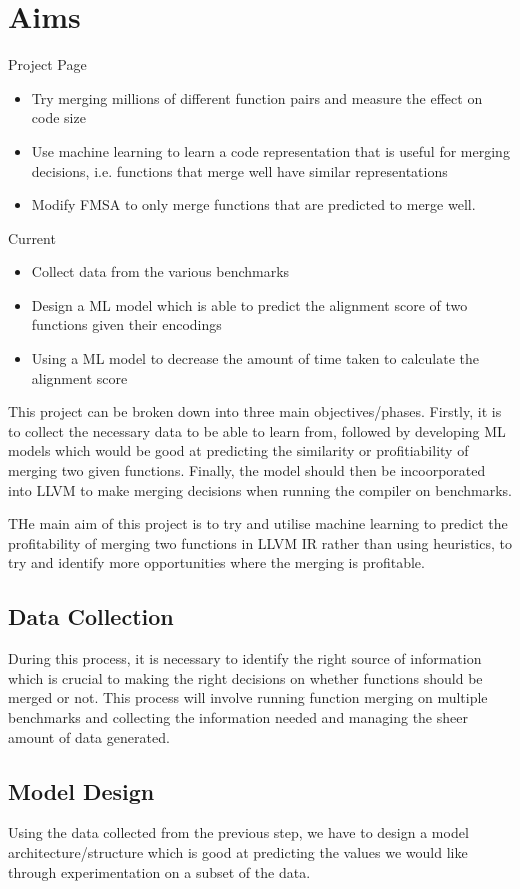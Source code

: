 \section{Aims}
Project Page
\begin{itemize}
    \item Try merging millions of different function pairs and measure the effect on code size
    \item Use machine learning to learn a code representation that is useful for merging decisions, i.e. functions that merge well have similar representations
    \item Modify FMSA to only merge functions that are predicted to merge well.
\end{itemize}
Current
\begin{itemize}
    \item Collect data from the various benchmarks
    \item Design a ML model which is able to predict the alignment score of two functions given their encodings
    \item Using a ML model to decrease the amount of time taken to calculate the alignment score
\end{itemize}


This project can be broken down into three main objectives/phases. Firstly, it is to collect the necessary data to be able to learn from, followed by developing ML models which would be good at predicting the similarity or profitiability of merging two given functions. Finally, the model should then be incoorporated into LLVM to make merging decisions when running the compiler on benchmarks.

THe main aim of this project is to try and utilise machine learning to predict the profitability of merging two functions in LLVM IR rather than using heuristics, to try and identify more opportunities where the merging is profitable.

\subsection{Data Collection}
During this process, it is necessary to identify the right source of information which is crucial to making the right decisions on whether functions should be merged or not. This process will involve running function merging on multiple benchmarks and collecting the information needed and managing the sheer amount of data generated.

\subsection{Model Design}
Using the data collected from the previous step, we have to design a model architecture/structure which is good at predicting the values we would like through experimentation on a subset of the data.

